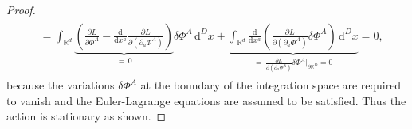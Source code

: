 \documentclass[a4paper,11pt]{article}
\numberwithin{equation}{section}
\begin{document}
{\begin{proof}
\begin{align}
\begin{aligned}
&=  \int_{\mathbb{R}^d} \underbrace{\left(\frac{\partial L}{\partial \Phi^A}-\frac{\mathrm{d}}{\mathrm{d}x^a}\frac{\partial L}{\partial(\partial_a\Phi^A)}\right)}_{=\,0}\delta \Phi^A \,\mathrm{d}^Dx + \underbrace{\int_{\mathbb{R}^d} \frac{\mathrm{d}}{\mathrm{d}x^a}\left(\frac{\partial L}{\partial(\partial_a\Phi^A)}\delta \Phi^A\right)\,\mathrm{d}^Dx}_{=\,\frac{\partial L}{\partial(\partial_a\Phi^A)}\delta\Phi^A \big|_{\partial \mathbb{R}^D}=0} = 0,
\end{aligned}
\end{align} because the variations $\delta \Phi^A$ at the boundary of the integration space are required to vanish and the Euler-Lagrange equations are assumed to be satisfied. Thus the action is stationary as shown.
\end{proof}

}
\end{document}
